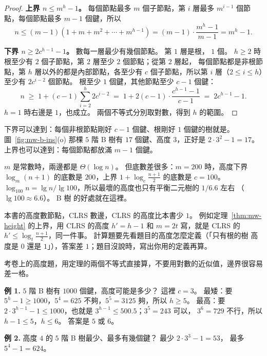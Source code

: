 \begin{proof}
\textbf{上界 $n \le m^h - 1$。} 每個節點最多 $m$ 個子節點，第 $i$ 層最多 $m^{i-1}$
個節點，每個節點最多 $m - 1$ 個鍵，所以
\[
n \le (m - 1)(1 + m + m^2 + \cdots + m^{h-1}) = (m - 1) \cdot \frac{m^h - 1}{m - 1}
= m^h - 1.
\]

\textbf{下界 $n \ge 2c^{h-1} - 1$。} 數每一層最少有幾個節點。 第 $1$ 層是根，
$1$ 個。 $h \ge 2$ 時根至少有 $2$ 個子節點，第 $2$ 層至少 $2$ 個節點；從第 $2$ 層起，
每個節點都是非根節點，第 $h$ 層以外的都是內部節點，各至少有 $c$ 個子節點，所以第
$i$ 層（$2 \le i \le h$）至少有 $2c^{i-2}$ 個節點。 根至少 $1$ 個鍵，其他節點至少
$c - 1$ 個鍵：
\[
n \;\ge\; 1 + (c - 1) \sum_{i=2}^{h} 2c^{i-2}
\;=\; 1 + 2(c - 1) \cdot \frac{c^{h-1} - 1}{c - 1}
\;=\; 2c^{h-1} - 1.
\]
$h = 1$ 時右邊是 $1$，也成立。 兩個不等式分別取對數，得到 $h$ 的範圍。
\end{proof}

下界可以達到：每個非根節點剛好 $c - 1$ 個鍵、根剛好 $1$ 個鍵的樹就是。
圖~\ref{fig:mw-b-ins}(o) 那棵 $5$ 階 B 樹有 $17$ 個鍵、高度 $3$，正好是
$2 \cdot 3^2 - 1 = 17$。 上界也可以達到：每個節點都放滿 $m - 1$ 個鍵。

$m$ 是常數時，兩邊都是 $\Theta(\log n)$。 但底數差很多：$m = 200$ 時，高度下界
$\log_m(n+1)$ 的底數是 $200$，上界 $1 + \log_c \frac{n+1}{2}$ 的底數是 $c = 100$。
$\log_{100} n = \lg n / \lg 100$，所以最壞的高度也只有平衡二元樹的 $1/6.6$ 左右
（$\lg 100 \approx 6.6$）。 B 樹
的好處就在這裡。

\begin{examnote}
本書的高度數節點，CLRS 數邊，CLRS 的高度比本書少 $1$。 例如定理~\ref{thm:mw-height}
的上界，用 CLRS 的高度 $h' = h - 1$ 和 $m = 2t$ 寫，就是 CLRS 的
$h' \le \log_t \frac{n+1}{2}$，同一件事。 計算題要先看題目的高度怎麼定義（「只有根的樹
高度是 $0$ 還是 $1$」），答案差 $1$；題目沒說時，寫出你用的定義再算。
\end{examnote}

考卷上的高度題，用定理的兩個不等式直接算，不要用對數的近似值，邊界很容易差一格。

\textbf{例 1.} $5$ 階 B 樹有 $1000$ 個鍵，高度可能是多少？ 這裡 $c = 3$。 最矮：要
$5^h - 1 \ge 1000$，$5^4 = 625$ 不夠，$5^5 = 3125$ 夠，所以 $h \ge 5$。 最高：要
$2 \cdot 3^{h-1} - 1 \le 1000$，也就是 $3^{h-1} \le 500.5$；$3^5 = 243$ 可以，
$3^6 = 729$ 不行，所以 $h - 1 \le 5$，$h \le 6$。 答案是 $5$ 或 $6$。

\textbf{例 2.} 高度 $4$ 的 $5$ 階 B 樹最少、最多有幾個鍵？ 最少 $2 \cdot 3^3 - 1 = 53$，
最多 $5^4 - 1 = 624$。


